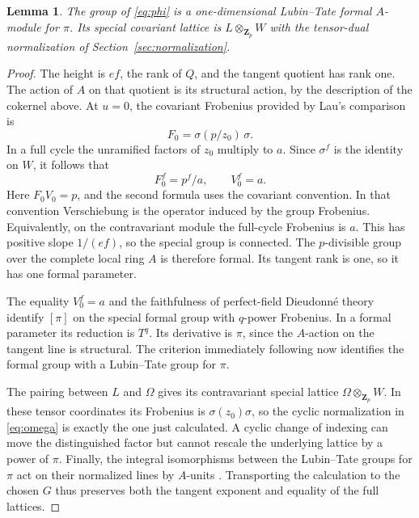 \documentclass[11pt]{article}
\newtheorem{lemma}[theorem]{Lemma}
\theoremstyle{definition}\newtheorem{definition}[theorem]{Definition}
\theoremstyle{remark}\newtheorem{remark}[theorem]{Remark}
\newcommand{\ZZ}{\mathbf Z}
\begin{document}
\begin{lemma}\label{lem:LT-identification}
The group of \eqref{eq:phi} is a one-dimensional Lubin--Tate formal $A$-module for $\pi$. Its special covariant lattice is $L\otimes_{\ZZ_p}W$ with the tensor-dual normalization of Section~\ref{sec:normalization}.
\end{lemma}

\begin{proof}
The height is $ef$, the rank of $Q$, and the tangent quotient has rank one. The action of $A$ on that quotient is its structural action, by the description of the cokernel above. At $u=0$, the covariant Frobenius provided by Lau's comparison is
\begin{equation}\label{eq:F0}
 F_0=\sigma(p/z_0)\,\sigma.
\end{equation}
In a full cycle the unramified factors of $z_0$ multiply to $a$. Since $\sigma^f$ is the identity on $W$, it follows that
\[
 F_0^f=p^f/a,\qquad V_0^f=a.
\]
Here $F_0V_0=p$, and the second formula uses the covariant convention. In that convention Verschiebung is the operator induced by the group Frobenius. Equivalently, on the contravariant module the full-cycle Frobenius is $a$. This has positive slope $1/(ef)$, so the special group is connected. The $p$-divisible group over the complete local ring $A$ is therefore formal. Its tangent rank is one, so it has one formal parameter.

The equality $V_0^f=a$ and the faithfulness of perfect-field Dieudonn\'e theory identify $[\pi]$ on the special formal group with $q$-power Frobenius. In a formal parameter its reduction is $T^q$. Its derivative is $\pi$, since the $A$-action on the tangent line is structural. The criterion immediately following \citet[Theorem~1, p.~383]{LubinTate} now identifies the formal group with a Lubin--Tate group for $\pi$.

The pairing between $L$ and $\Omega$ gives its contravariant special lattice $\Omega\otimes_{\ZZ_p}W$. In these tensor coordinates its Frobenius is $\sigma(z_0)\sigma$, so the cyclic normalization in \eqref{eq:omega} is exactly the one just calculated. A cyclic change of indexing can move the distinguished factor but cannot rescale the underlying lattice by a power of $\pi$. Finally, the integral isomorphisms between the Lubin--Tate groups for $\pi$ act on their normalized lines by $A$-units \citep[Lemma~1 and Theorem~1, pp.~381--383]{LubinTate}. Transporting the calculation to the chosen $G$ thus preserves both the tangent exponent and equality of the full lattices.
\end{proof}
\end{document}
